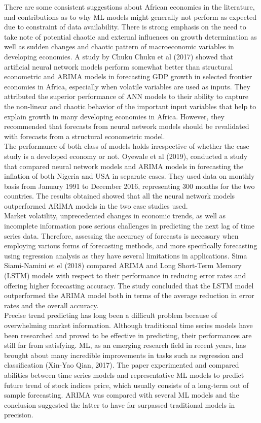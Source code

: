 \documentclass[12pt,italian, twoside]{report}
\begin{document}
There are some consistent suggestions about African economies in the literature, and contributions as to why ML models might generally not perform as expected due to constraint of data availability. There is strong emphasis on the need to take note of potential chaotic and external influences on growth determination as well as sudden changes and chaotic pattern of macroeconomic variables in developing economies. A study by Chuku Chuku et al (2017) showed that artificial neural network models perform somewhat better than structural econometric and ARIMA models in forecasting GDP growth in selected frontier economies in Africa, especially when volatile variables are used as inputs. They attributed the superior performance of ANN models to their ability to capture the non-linear and chaotic behavior of the important input variables that help to explain growth in many developing economies in Africa. However, they recommended that forecasts from neural network models should be revalidated with forecasts from a structural econometric model.\\ 
The performance of both class of models holds irrespective of whether the case study is a developed economy or not. Oyewale et al (2019), conducted a study that compared neural network models and ARIMA models in forecasting the inflation of both Nigeria and USA in separate cases. They used data on monthly basis from January 1991 to December 2016, representing 300 months for the two countries. The results obtained showed that all the neural network models outperformed ARIMA models in the two case studies used.\\
Market volatility, unprecedented changes in economic trends, as well as incomplete information pose serious challenges in predicting the next lag of time series data. Therefore, assessing the accuracy of forecasts is necessary when employing various forms of forecasting methods, and more specifically forecasting using regression analysis as they have several limitations in applications. Sima Siami-Namini et el (2018) compared ARIMA and Long Short-Term Memory (LSTM) models with respect to their performance in reducing error rates and offering higher forecasting accuracy. The study concluded that the LSTM model outperformed the ARIMA model both in terms of the average reduction in error rates and the overall accuracy.\\
Precise trend predicting has long been a difficult problem because of overwhelming market information. Although traditional time series models have been researched and proved to be effective in predicting, their performances are still far from satisfying. ML, as an emerging research field in recent years, has brought about many incredible improvements in tasks such as regression and classification (Xin-Yao Qian, 2017). The paper experimented and compared abilities between time series models and representative ML models to predict future trend of stock indices price, which usually consists of a long-term out of sample forecasting. ARIMA was compared with several ML models and the conclusion suggested the latter to have far surpassed traditional models in precision. \\
\end{document}
